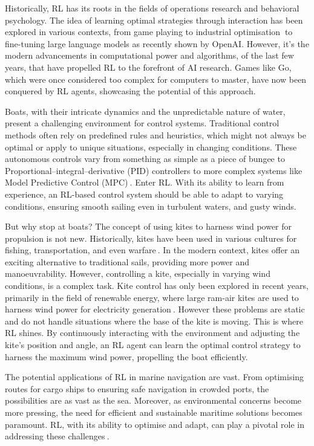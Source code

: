 Historically, RL has its roots in the fields of operations research and behavioral psychology. The idea of learning optimal strategies through interaction has been explored in various contexts, from game playing to industrial optimisation$~$\cite{bellman1957dynamic} to fine-tuning large language models as recently shown by OpenAI. However, it's the modern advancements in computational power and algorithms, of the last few years, that have propelled RL to the forefront of AI research. Games like Go, which were once considered too complex for computers to master, have now been conquered by RL agents, showcasing the potential of this approach\cite{silver2016mastering}.

Boats, with their intricate dynamics and the unpredictable nature of water, present a challenging environment for control systems. Traditional control methods often rely on predefined rules and heuristics, which might not always be optimal or apply to unique situations, especially in changing conditions. These autonomous controls vary from something as simple as a piece of bungee to Proportional–integral–derivative (PID) controllers to more complex systems like Model Predictive Control (MPC)$~$\cite{erhard2013control}. Enter RL. With its ability to learn from experience, an RL-based control system should be able to adapt to varying conditions, ensuring smooth sailing even in turbulent waters, and gusty winds.

But why stop at boats? The concept of using kites to harness wind power for propulsion is not new. Historically, kites have been used in various cultures for fishing, transportation, and even warfare$~$\cite{hallion2003taking}. In the modern context, kites offer an exciting alternative to traditional sails, providing more power and manoeuvrability. However, controlling a kite, especially in varying wind conditions, is a complex task.  Kite control has only been explored in recent years, primarily in the field of renewable energy, where large ram-air kites are used to harness wind power for electricity generation$~$\cite{kitecontrol}. However these problems are static and do not handle situations where the base of the kite is moving. This is where RL shines. By continuously interacting with the environment and adjusting the kite's position and angle, an RL agent can learn the optimal control strategy to harness the maximum wind power, propelling the boat efficiently.

The potential applications of RL in marine navigation are vast. From optimising routes for cargo ships to ensuring safe navigation in crowded ports, the possibilities are as vast as the sea. Moreover, as environmental concerns become more pressing, the need for efficient and sustainable maritime solutions becomes paramount. RL, with its ability to optimise and adapt, can play a pivotal role in addressing these challenges$~$\cite{christiansen2013ship}.

